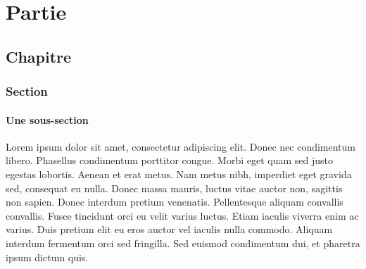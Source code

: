 \documentclass{report}
\begin{document}
 
\part{Partie}
\chapter{Chapitre}
\section{Section}
\subsection{Une sous-section}
Lorem ipsum dolor sit amet, consectetur adipiscing elit.
Donec nec condimentum libero. Phasellus condimentum porttitor congue.
Morbi eget quam sed justo egestas lobortis. Aenean et erat metus.
Nam metus nibh, imperdiet eget gravida sed, consequat eu nulla. Donec massa mauris, luctus vitae auctor non, sagittis non sapien.
Donec interdum pretium venenatis. Pellentesque aliquam convallis convallis.
Fusce tincidunt orci eu velit varius luctus. Etiam iaculis viverra enim ac varius.
Duis pretium elit eu eros auctor vel iaculis nulla commodo. Aliquam interdum fermentum orci sed fringilla.
Sed euismod condimentum dui, et pharetra ipsum dictum quis.
 
\end{document}
